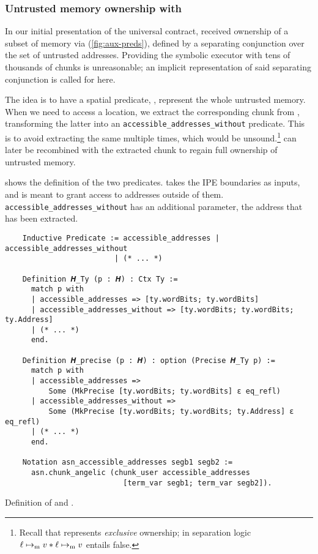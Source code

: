 \subsubsection{Untrusted memory ownership with }

In our initial presentation of the universal contract,  received ownership of a subset of memory via  (\cref{fig:aux-preds}), defined by a separating conjunction over the set of untrusted addresses. Providing the symbolic executor with tens of thousands of  chunks is unreasonable; an implicit representation of said separating conjunction is called for here.

The idea is to have a spatial predicate, , represent the whole untrusted memory. When we need to access a location, we extract the corresponding  chunk from , transforming the latter into an \texttt{ac\-ces\-si\-ble\_ad\-dresses\_with\-out} predicate. This is to avoid extracting the same  multiple times, which would be unsound.\footnote{Recall that  represents \emph{exclusive} ownership; in separation logic \(\ell \mapsto_{\mathrm{m}} v \ast \ell \mapsto_{\mathrm{m}} v\) entails false.}  can later be recombined with the extracted chunk to regain full ownership of untrusted memory.

 shows the definition of the two predicates.  takes the IPE boundaries as inputs, and is meant to grant access to addresses outside of them. \texttt{ac\-ces\-si\-ble\_ad\-dresses\_with\-out} has an additional parameter, the address that has been extracted.

\begin{listing}
  \begin{verbatim}
    Inductive Predicate := accessible_addresses | accessible_addresses_without
                         | (* ... *)

    Definition 𝑯_Ty (p : 𝑯) : Ctx Ty :=
      match p with
      | accessible_addresses => [ty.wordBits; ty.wordBits]
      | accessible_addresses_without => [ty.wordBits; ty.wordBits; ty.Address]
      | (* ... *)
      end.

    Definition 𝑯_precise (p : 𝑯) : option (Precise 𝑯_Ty p) :=
      match p with
      | accessible_addresses =>
          Some (MkPrecise [ty.wordBits; ty.wordBits] ε eq_refl)
      | accessible_addresses_without =>
          Some (MkPrecise [ty.wordBits; ty.wordBits; ty.Address] ε eq_refl)
      | (* ... *)
      end.

    Notation asn_accessible_addresses segb1 segb2 :=
      asn.chunk_angelic (chunk_user accessible_addresses
                           [term_var segb1; term_var segb2]).
  \end{verbatim}
  \caption{Definition of  and .}
  \label{lst:accessible_addresses}
\end{listing}

